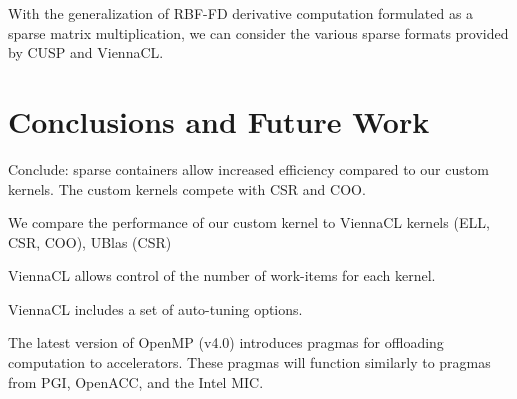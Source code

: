 \documentclass{report}
\begin{document}

With the generalization of RBF-FD derivative computation formulated as a sparse matrix multiplication, we can 
consider the various sparse formats provided by CUSP and ViennaCL. 





\section{Conclusions and Future Work}

Conclude: sparse containers allow increased efficiency compared to our custom kernels. The custom kernels compete with CSR and COO. 




We compare the performance of our custom kernel to ViennaCL kernels (ELL, CSR, COO), UBlas (CSR) 


ViennaCL allows control of the number of work-items for each kernel. 

ViennaCL includes a set of auto-tuning options. %









The latest version of OpenMP (v4.0) introduces pragmas for offloading computation to accelerators. These pragmas will function similarly to pragmas from PGI, OpenACC, and the Intel MIC. 
\end{document}
